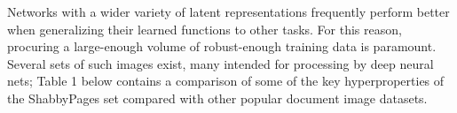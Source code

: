 \documentclass[runningheads]{llncs}
\begin{document}
Networks with a wider variety of latent representations frequently perform better when generalizing their learned functions to other tasks.
For this reason, procuring a large-enough volume of robust-enough training data is paramount.
Several sets of such images exist, many intended for processing by deep neural nets; Table 1 below contains a comparison of some of the key hyperproperties of the ShabbyPages set compared with other popular document image datasets.

\end{document}
